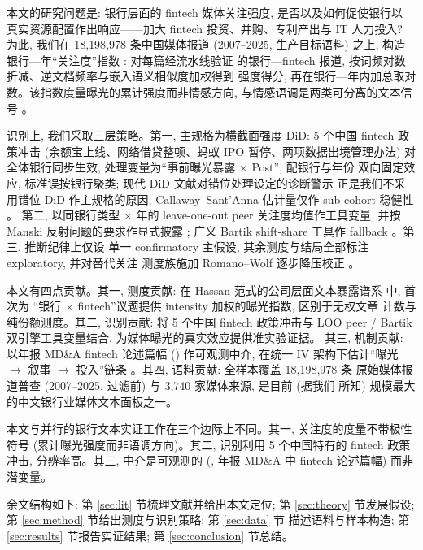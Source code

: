 本文的研究问题是: 银行层面的 fintech 媒体关注强度, 是否以及如何促使银行以
真实资源配置作出响应——加大 fintech 投资、并购、专利产出与 IT 人力投入?
为此, 我们在 18{,}198{,}978 条中国媒体报道 (2007--2025, 生产目标语料) 之上,
构造银行—年``关注度''指数 : 对每篇经流水线验证
的银行—fintech 报道, 按词频对数折减、逆文档频率与嵌入语义相似度加权得到
强度得分, 再在银行—年内加总取对数。该指数度量曝光的累计强度而非情感方向,
与情感语调是两类可分离的文本信号 \parencite{cookson2024social}。

识别上, 我们采取三层策略。第一, 主规格为横截面强度 DiD: 5 个中国 fintech
政策冲击 (余额宝上线、网络借贷整顿、蚂蚁 IPO 暂停、两项数据出境管理办法)
对全体银行同步生效, 处理变量为``事前曝光暴露 $\times$ Post'', 配银行与年份
双向固定效应, 标准误按银行聚类; 现代 DiD 文献对错位处理设定的诊断警示
\parencite{baker2022staggered} 正是我们不采用错位 DiD 作主规格的原因,
Callaway--Sant'Anna 估计量仅作 sub-cohort 稳健性 \parencite{callaway2021difference}。
第二, 以同银行类型 $\times$ 年的 leave-one-out peer 关注度均值作工具变量,
并按 Manski 反射问题的要求作显式披露 \parencite{manski1993reflection,bramoulle2009peer};
广义 Bartik shift-share 工具作 fallback
\parencite{goldsmith2020bartik,borusyak2022shiftshare}。第三, 推断纪律上仅设
单一 confirmatory 主假设, 其余测度与结局全部标注 exploratory, 并对替代关注
测度族施加 Romano--Wolf 逐步降压校正 \parencite{romanowolf2005snooping}。

本文有四点贡献。其一, 测度贡献: 在 Hassan 范式的公司层面文本暴露谱系
\parencite{hassan2019firm,sautner2023climate,hassan2023epidemic} 中, 首次为
``银行 $\times$ fintech''议题提供 intensity 加权的曝光指数, 区别于无权文章
计数与纯份额测度。其二, 识别贡献: 将 5 个中国 fintech 政策冲击与 LOO
peer / Bartik 双引擎工具变量结合, 为媒体曝光的真实效应提供准实验证据。
其三, 机制贡献: 以年报 MD\&A fintech 论述篇幅 ()
作可观测中介, 在统一 IV 架构下估计``曝光 $\to$ 叙事 $\to$ 投入''链条
\parencite{dippel2020ivmediate}。其四, 语料贡献: 全样本覆盖 18{,}198{,}978 条
原始媒体报道普查 (2007--2025, 过滤前) 与 3{,}740 家媒体来源, 是目前 (据我们
所知) 规模最大的中文银行业媒体文本面板之一。

本文与并行的银行文本实证工作在三个边际上不同。其一, 关注度的度量不带极性
符号 (累计曝光强度而非语调方向)。其二, 识别利用 5 个中国特有的 fintech
政策冲击, 分辨率高。其三, 中介是可观测的
(, 年报 MD\&A 中 fintech 论述篇幅) 而非潜变量。

余文结构如下: 第 \ref{sec:lit} 节梳理文献并给出本文定位; 第 \ref{sec:theory}
节发展假设; 第 \ref{sec:method} 节给出测度与识别策略; 第 \ref{sec:data} 节
描述语料与样本构造; 第 \ref{sec:results} 节报告实证结果;
第 \ref{sec:conclusion} 节总结。


